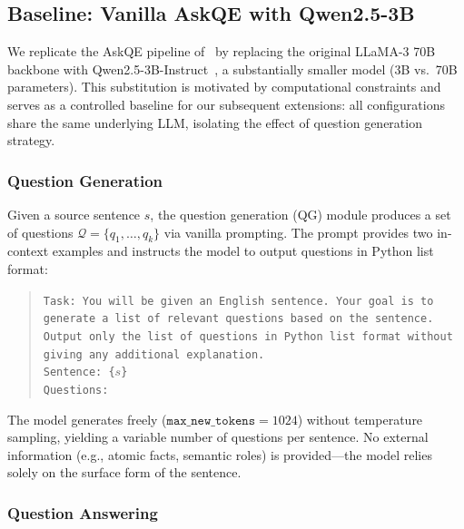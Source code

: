
\subsection{Baseline: Vanilla AskQE with Qwen2.5-3B}
\label{sec:baseline}

We replicate the AskQE pipeline of~\citet{ki-etal-2025-askqe} by replacing the original LLaMA-3 70B backbone with Qwen2.5-3B-Instruct~\cite{qwen2025}, a substantially smaller model (3B vs.\ 70B parameters). This substitution is motivated by computational constraints and serves as a controlled baseline for our subsequent extensions: all configurations share the same underlying LLM, isolating the effect of question generation strategy.

\subsubsection{Question Generation}

Given a source sentence $s$, the question generation (QG) module produces a set of questions $\mathcal{Q} = \{q_1, \ldots, q_k\}$ via vanilla prompting. The prompt provides two in-context examples and instructs the model to output questions in Python list format:

\begin{quote}
\small
\texttt{Task: You will be given an English sentence. Your goal is to generate a list of relevant questions based on the sentence. Output only the list of questions in Python list format without giving any additional explanation.}\\[3pt]
\texttt{Sentence: \{$s$\}}\\
\texttt{Questions:}
\end{quote}

The model generates freely ($\texttt{max\_new\_tokens} = 1024$) without temperature sampling, yielding a variable number of questions per sentence. No external information (e.g., atomic facts, semantic roles) is provided---the model relies solely on the surface form of the sentence.

\subsubsection{Question Answering}

